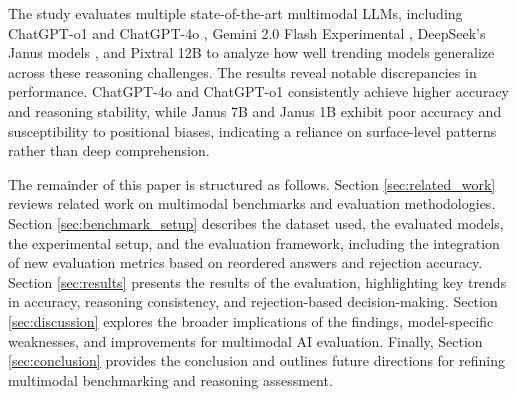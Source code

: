 The study evaluates multiple state-of-the-art multimodal LLMs, including ChatGPT-o1 and ChatGPT-4o \cite{chatgpt}, Gemini 2.0 Flash Experimental \cite{gemini}, DeepSeek’s Janus models \cite{chen2025janus}, and Pixtral 12B \cite{agrawal2024pixtral} to analyze how well trending models generalize across these reasoning challenges. The results reveal notable discrepancies in performance. ChatGPT-4o and ChatGPT-o1 consistently achieve higher accuracy and reasoning stability, while Janus 7B and Janus 1B exhibit poor accuracy and susceptibility to positional biases, indicating a reliance on surface-level patterns rather than deep comprehension.

The remainder of this paper is structured as follows. Section \ref{sec:related_work} reviews related work on multimodal benchmarks and evaluation methodologies. Section \ref{sec:benchmark_setup} describes the dataset used, the evaluated models, the experimental setup, and the evaluation framework, including the integration of new evaluation metrics based on reordered answers and rejection accuracy. Section \ref{sec:results} presents the results of the evaluation, highlighting key trends in accuracy, reasoning consistency, and rejection-based decision-making. Section \ref{sec:discussion} explores the broader implications of the findings, model-specific weaknesses, and improvements for multimodal AI evaluation. Finally, Section \ref{sec:conclusion} provides the conclusion and outlines future directions for refining multimodal benchmarking and reasoning assessment.

